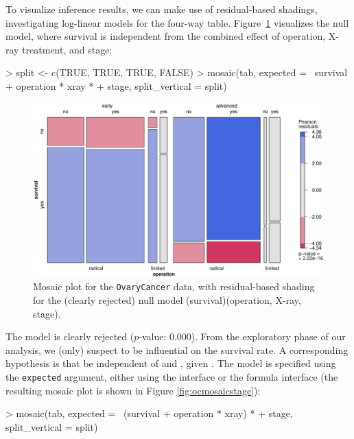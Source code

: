 \documentclass{Z}
\newcommand{\data}[1]{\texttt{#1}}
\newcommand{\codefun}[1]{\code{#1()}}
\begin{document}
To visualize inference results, we can make use of residual-based
shadings, investigating log-linear models for the four-way table. 
Figure~\ref{fig:ocmosaicnull} visualizes the null model, where
survival is independent from the combined effect of operation, X-ray
treatment, and stage:

\begin{Schunk}
\begin{Sinput}
> split <- c(TRUE, TRUE, TRUE, FALSE)
> mosaic(tab, expected = ~survival + operation * xray * 
+     stage, split_vertical = split)
\end{Sinput}
\end{Schunk}

\begin{figure}[p]
\begin{center}
\includegraphics{strucplot-ocmosaicnull}
\caption{Mosaic plot for the \data{OvaryCancer} data, with residual-based shading
for the (clearly rejected) null model (survival)(operation, X-ray, stage).}
\label{fig:ocmosaicnull}
\end{center}
\end{figure}

\noindent The model is clearly rejected ($p$-value: 0.000). From the exploratory phase of
our analysis, we (only) suspect  to be influential on the survival rate. A 
corresponding hypothesis is that  be independent of  
and , given
. The model is specified using the \texttt{expected} argument, 
either using the \codefun{loglin} interface or 
the \codefun{loglm} formula interface (the resulting mosaic plot is shown in Figure
\ref{fig:ocmosaicstage}):

\begin{Schunk}
\begin{Sinput}
> mosaic(tab, expected = ~(survival + operation * xray) * 
+     stage, split_vertical = split)
\end{Sinput}
\end{Schunk}
\end{document}
